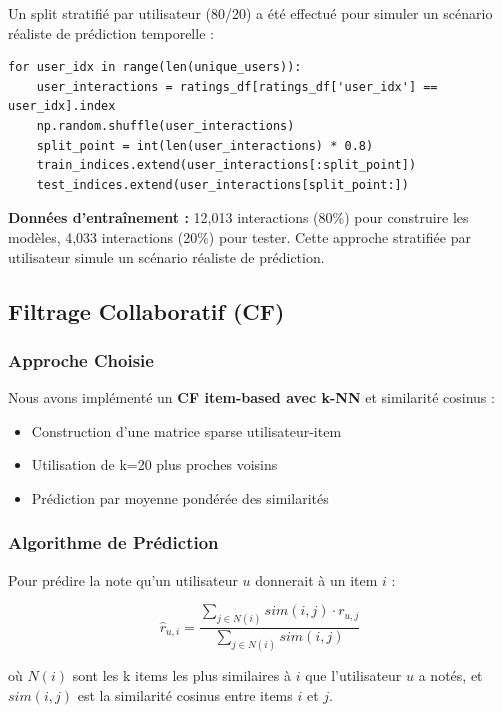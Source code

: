 \documentclass[12pt,a4paper]{article}
\begin{document}
Un split stratifié par utilisateur (80/20) a été effectué pour simuler un scénario réaliste de prédiction temporelle :

\begin{lstlisting}
for user_idx in range(len(unique_users)):
    user_interactions = ratings_df[ratings_df['user_idx'] == user_idx].index
    np.random.shuffle(user_interactions)
    split_point = int(len(user_interactions) * 0.8)
    train_indices.extend(user_interactions[:split_point])
    test_indices.extend(user_interactions[split_point:])
\end{lstlisting}

\textbf{Données d'entraînement :} 12,013 interactions (80\%) pour construire les modèles, 4,033 interactions (20\%) pour tester. Cette approche stratifiée par utilisateur simule un scénario réaliste de prédiction.

\subsection{Filtrage Collaboratif (CF)}

\subsubsection{Approche Choisie}

Nous avons implémenté un \textbf{CF item-based avec k-NN} et similarité cosinus :

\begin{itemize}
    \item Construction d'une matrice sparse utilisateur-item
    \item Utilisation de k=20 plus proches voisins
    \item Prédiction par moyenne pondérée des similarités
\end{itemize}

\subsubsection{Algorithme de Prédiction}

Pour prédire la note qu'un utilisateur $u$ donnerait à un item $i$ :

\begin{equation}
\hat{r}_{u,i} = \frac{\sum_{j \in N(i)} sim(i,j) \cdot r_{u,j}}{\sum_{j \in N(i)} sim(i,j)}
\end{equation}

où $N(i)$ sont les k items les plus similaires à $i$ que l'utilisateur $u$ a notés, et $sim(i,j)$ est la similarité cosinus entre items $i$ et $j$.
\end{document}
